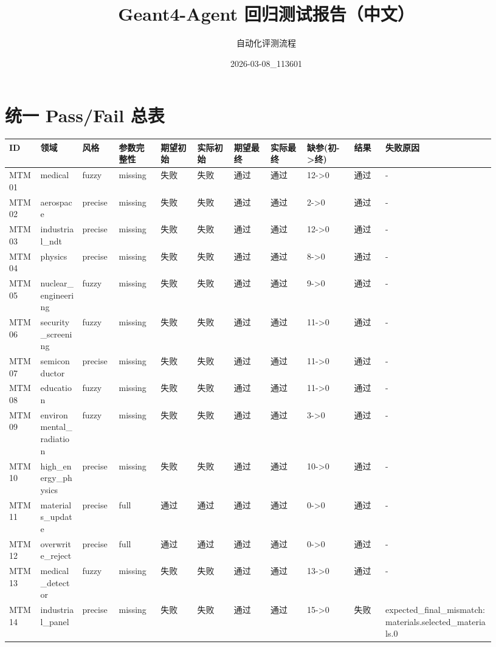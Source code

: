 \documentclass[11pt]{ctexart}
\title{Geant4-Agent 回归测试报告（中文）}
\author{自动化评测流程}
\date{2026-03-08\_113601}
\begin{document}
\maketitle
\section{统一 Pass/Fail 总表}
\begin{longtable}{p{0.06\linewidth}p{0.08\linewidth}p{0.07\linewidth}p{0.08\linewidth}p{0.07\linewidth}p{0.07\linewidth}p{0.07\linewidth}p{0.07\linewidth}p{0.09\linewidth}p{0.06\linewidth}p{0.21\linewidth}}
\toprule
ID & 领域 & 风格 & 参数完整性 & 期望初始 & 实际初始 & 期望最终 & 实际最终 & 缺参(初->终) & 结果 & 失败原因 \\
\midrule
MTM01 & medical & fuzzy & missing & 失败 & 失败 & 通过 & 通过 & 12->0 & 通过 & - \\
MTM02 & aerospace & precise & missing & 失败 & 失败 & 通过 & 通过 & 2->0 & 通过 & - \\
MTM03 & industrial\_ndt & precise & missing & 失败 & 失败 & 通过 & 通过 & 12->0 & 通过 & - \\
MTM04 & physics & precise & missing & 失败 & 失败 & 通过 & 通过 & 8->0 & 通过 & - \\
MTM05 & nuclear\_engineering & fuzzy & missing & 失败 & 失败 & 通过 & 通过 & 9->0 & 通过 & - \\
MTM06 & security\_screening & fuzzy & missing & 失败 & 失败 & 通过 & 通过 & 11->0 & 通过 & - \\
MTM07 & semiconductor & precise & missing & 失败 & 失败 & 通过 & 通过 & 11->0 & 通过 & - \\
MTM08 & education & fuzzy & missing & 失败 & 失败 & 通过 & 通过 & 11->0 & 通过 & - \\
MTM09 & environmental\_radiation & fuzzy & missing & 失败 & 失败 & 通过 & 通过 & 3->0 & 通过 & - \\
MTM10 & high\_energy\_physics & precise & missing & 失败 & 失败 & 通过 & 通过 & 10->0 & 通过 & - \\
MTM11 & materials\_update & precise & full & 通过 & 通过 & 通过 & 通过 & 0->0 & 通过 & - \\
MTM12 & overwrite\_reject & precise & full & 通过 & 通过 & 通过 & 通过 & 0->0 & 通过 & - \\
MTM13 & medical\_detector & fuzzy & missing & 失败 & 失败 & 通过 & 通过 & 13->0 & 通过 & - \\
MTM14 & industrial\_panel & precise & missing & 失败 & 失败 & 通过 & 通过 & 15->0 & 失败 & expected\_final\_mismatch:materials.selected\_materials.0 \\

\end{longtable}
\end{document}
